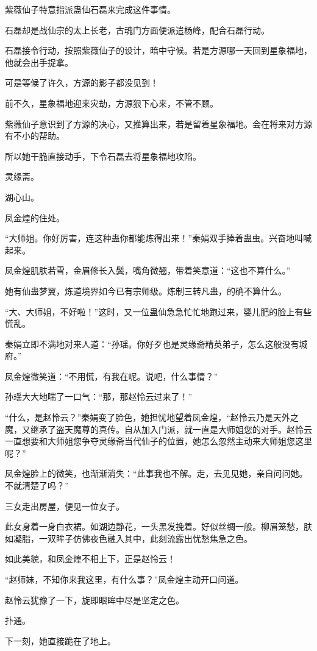 \begin{this_body}
紫薇仙子特意指派蛊仙石磊来完成这件事情。

石磊却是战仙宗的太上长老，古魂门方面便派遣杨峰，配合石磊行动。

石磊接令行动，按照紫薇仙子的设计，暗中守候。若是方源哪一天回到星象福地，他就会出手捉拿。

可是等候了许久，方源的影子都没见到！

前不久，星象福地迎来灾劫，方源狠下心来，不管不顾。

紫薇仙子意识到了方源的决心，又推算出来，若是留着星象福地。会在将来对方源有不小的帮助。

所以她干脆直接动手，下令石磊去将星象福地攻陷。

灵缘斋。

湖心山。

凤金煌的住处。

“大师姐。你好厉害，连这种蛊你都能炼得出来！”秦娟双手捧着蛊虫。兴奋地叫喊起来。

凤金煌肌肤若雪，金眉修长入鬓，嘴角微翘，带着笑意道：“这也不算什么。”

她有仙蛊梦翼，炼道境界如今已有宗师级。炼制三转凡蛊，的确不算什么。

“大、大师姐，不好啦！”这时，又一位蛊仙急急忙忙地跑过来，婴儿肥的脸上有些慌乱。

秦娟立即不满地对来人道：“孙瑶。你好歹也是灵缘斋精英弟子，怎么这般没有城府。”

凤金煌微笑道：“不用慌，有我在呢。说吧，什么事情？”

孙瑶大大地喘了一口气：“那，那赵怜云过来了！”

“什么，是赵怜云？”秦娟变了脸色，她担忧地望着凤金煌，“赵怜云乃是天外之魔，又继承了盗天魔尊的真传。自从加入门派，就一直是大师姐您的对手。赵怜云一直想要和大师姐您争夺灵缘斋当代仙子的位置，她怎么忽然主动来大师姐您这里呢？”

凤金煌脸上的微笑，也渐渐消失：“此事我也不解。走，去见见她，亲自问问她。不就清楚了吗？”

三女走出房屋，便见一位女子。

此女身着一身白衣裙。如湖边静花，一头黑发挽着。好似丝绸一般。柳眉笼愁，肤如凝脂，一双眸子仿佛夜色融入其中，此刻流露出忧愁焦急之色。

如此美貌，和凤金煌不相上下，正是赵怜云！

“赵师妹，不知你来我这里，有什么事？”凤金煌主动开口问道。

赵怜云犹豫了一下，旋即眼眸中尽是坚定之色。

扑通。

下一刻，她直接跪在了地上。


\end{this_body}
